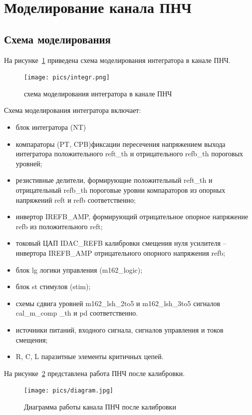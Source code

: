 \documentclass[a4paper,12pt,oneside]{scrartcl}
\begin{document}
\section{Моделирование канала ПНЧ}
\subsection{Схема моделирования}
На рисунке~\ref{fig:integrmode} приведена схема моделирования интегратора в канале ПНЧ.

\begin{figure}[!htb]
\centering
\texttt{[image: pics/integr.png]}
\caption{схема моделирования интегратора в канале ПНЧ}
\label{fig:integrmode}
\end{figure}
\FloatBarrier

Схема моделирования интегратора включает:

\begin{itemize}
    \item блок интегратора (NT)
    \item компараторы (PT, CPB)фиксации пересечения напряжением выхода интегратора положительного reft\_th и отрицательного refb\_th пороговых уровней;
    \item резистивные делители, формирующие положительный reft\_th и отрицательный refb\_th пороговые уровни компараторов из опорных напряжений reft и refb соответственно;
    \item инвертор IREFB\_AMP, формирующий отрицательное опорное напряжение refb из положительного reft;
    \item токовый ЦАП IDAC\_REFB калибровки смещения нуля усилителя – инвертора IREFB\_AMP отрицательного опорного напряжения refb;
    \item блок lg логики управления (m162\_logic);
    \item блок st стимулов (stim);
    \item схемы сдвига уровней m162\_lsh\_2to5 и m162\_lsh\_3to5 сигналов cal\_m\_comp \_th и  pd соответственно.
    \item источники питаний, входного сигнала, сигналов управления и токов смещения;
    \item R, C, L паразитные элементы критичных цепей.
\end{itemize}

На рисунке~\ref{fig:diagram} представлена работа ПНЧ после калибровки.

\begin{figure}[!htb]
\centering
\texttt{[image: pics/diagram.jpg]}
\caption{Диаграмма работы канала ПНЧ после калибровки}
\label{fig:diagram}
\end{figure}
\FloatBarrier
\end{document}
